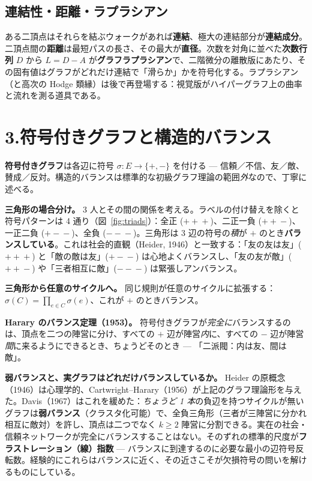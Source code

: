 \documentclass[10pt]{article}
\newcommand{\keyword}[1]{\textbf{\color{accent}#1}}
\begin{document}
\subsection*{連結性・距離・ラプラシアン}
ある二頂点はそれらを結ぶウォークがあれば\keyword{連結}、極大の連結部分が\keyword{連結成分}。二頂点間の\keyword{距離}は最短パスの長さ、その最大が\keyword{直径}。次数を対角に並べた\keyword{次数行列} $D$ から $L=D-A$ が\keyword{グラフラプラシアン}で、二階微分の離散版にあたり、その固有値はグラフがどれだけ連結で「滑らか」かを符号化する。ラプラシアン（と高次の Hodge 類縁）は後で再登場する：視覚版がハイパーグラフ上の曲率と流れを測る道具である。

\section*{\color{accent}3.\quad 符号付きグラフと構造的バランス}
\keyword{符号付きグラフ}は各辺に符号 $\sigma:E\to\{+,-\}$ を付ける --- 信頼／不信、友／敵、賛成／反対。構造的バランスは標準的な初級グラフ理論の範囲\emph{外}なので、丁寧に述べる。

\textbf{三角形の場合分け。} 3 人とその間の関係を考える。ラベルの付け替えを除くと符号パターンは 4 通り（図~\ref{fig:triads}）：全正 ($+\!+\!+$)、二正一負 ($+\!+\!-$)、一正二負 ($+\!-\!-$)、全負 ($-\!-\!-$)。三角形は 3 辺の符号の\emph{積}が $+$ のとき\keyword{バランスしている}。これは社会的直観（Heider, 1946）と一致する：「友の友は友」($+\!+\!+$) と「敵の敵は友」($+\!-\!-$) は心地よくバランスし、「友の友が敵」($+\!+\!-$) や「三者相互に敵」($-\!-\!-$) は緊張しアンバランス。

\textbf{三角形から任意のサイクルへ。} 同じ規則が任意のサイクルに拡張する：$\sigma(C)=\prod_{e\in C}\sigma(e)$、これが $+$ のときバランス。

\textbf{Harary のバランス定理（1953）。} 符号付きグラフが\emph{完全に}バランスするのは、頂点を二つの陣営に分け、すべての $+$ 辺が陣営\emph{内}に、すべての $-$ 辺が陣営\emph{間}に来るようにできるとき、ちょうどそのとき --- 「二派閥：内は友、間は敵」。

\textbf{弱バランスと、実グラフはどれだけバランスしているか。} Heider の原概念（1946）は心理学的、Cartwright--Harary（1956）が上記のグラフ理論形を与えた。Davis（1967）はこれを緩めた：\emph{ちょうど 1 本}の負辺を持つサイクルが無いグラフは\keyword{弱バランス}（クラスタ化可能）で、全負三角形（三者が三陣営に分かれ相互に敵対）を許し、頂点は二つでなく $k\ge2$ 陣営に分割できる。実在の社会・信頼ネットワークが完全にバランスすることはない。そのずれの標準的尺度が\keyword{フラストレーション（線）指数} --- バランスに到達するのに必要な最小の辺符号反転数。経験的にこれらはバランスに近く、その近さこそが欠損符号の問いを解けるものにしている。
\end{document}
